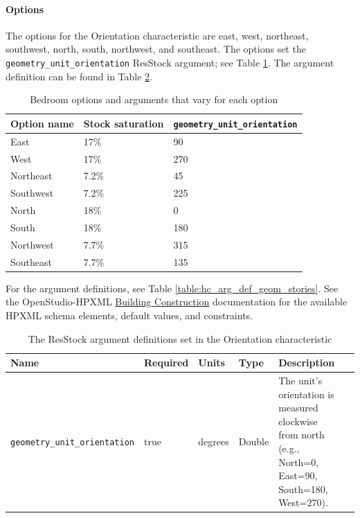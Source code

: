 \paragraph{Options}
The options for the Orientation characteristic are east, west, northeast, southwest, north, south, northwest, and southeast. The options set the \texttt{geometry\_unit\_orientation} ResStock argument; see Table \ref{table:hc_opt_orient}. The argument definition can be found in Table \ref{table:hc_arg_def_oient}.

\begin{longtable}[]{ |p{}|p{2cm}|p{4cm}| } \caption{Bedroom options and arguments that vary for each option} \label{table:hc_opt_orient} \\  
\toprule\noalign{}
Option name & Stock saturation & \texttt{geometry\_unit\_orientation} \\
\midrule\noalign{}
\endhead
\bottomrule\noalign{}
\endlastfoot
East & 17\% & 90 \\ \hline
West & 17\% & 270 \\ \hline
Northeast & 7.2\% & 45 \\ \hline
Southwest & 7.2\% & 225 \\ \hline
North & 18\% & 0 \\ \hline
South & 18\% & 180 \\ \hline
Northwest & 7.7\% & 315 \\ \hline
Southeast & 7.7\% & 135 \\ \hline
\end{longtable}

For the argument definitions, see Table \ref{table:hc_arg_def_geom_stories}. See the OpenStudio-HPXML \href{https://openstudio-hpxml.readthedocs.io/en/v1.8.1/workflow_inputs.html#hpxml-building-construction}{Building Construction} documentation for the available HPXML schema elements, default values, and constraints.

\begin{longtable}[]{ |p{}|p{1.5cm}|p{1cm}|p{1.1cm}|p{1.4cm}|p{6cm}|}
\caption{The ResStock argument definitions set in the Orientation characteristic} \label{table:hc_arg_def_oient} \\
\toprule\noalign{}
Name & Required & Units & Type & Description \\
\midrule\noalign{}
\endhead
\bottomrule\noalign{}
\endlastfoot
\texttt{geometry\_unit\_orientation} & true & degrees & Double & The
unit's orientation is measured clockwise from north
(e.g., North=0, East=90, South=180, West=270). \\
\end{longtable}

